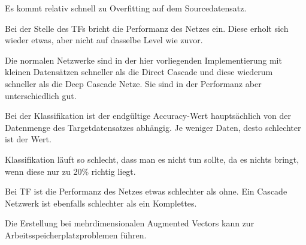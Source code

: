 
Es kommt relativ schnell zu Overfitting auf dem Sourcedatensatz. %

Bei der Stelle des TFs bricht die Performanz des Netzes ein. Diese erholt sich wieder etwas, aber nicht auf dasselbe Level wie zuvor. 


Die normalen Netzwerke sind in der hier vorliegenden Implementierung mit kleinen Datensätzen schneller als die Direct Cascade und diese 
wiederum schneller als die Deep Cascade Netze. 
Sie sind in der Performanz aber unterschiedlich gut. \newline



Bei der Klassifikation ist der endgültige Accuracy-Wert hauptsächlich von der Datenmenge des Targetdatensatzes abhängig. 
Je weniger Daten, desto schlechter ist der Wert. %

Klassifikation läuft so schlecht, dass man es nicht tun sollte, da es nichts bringt, wenn diese nur zu 20\% richtig liegt. 

Bei TF ist die Performanz des Netzes etwas schlechter als ohne. %
Ein Cascade Netzwerk ist ebenfalls schlechter als ein Komplettes. %


Die Erstellung bei mehrdimensionalen Augmented Vectors kann zur Arbeitsspeicherplatzproblemen führen. %

